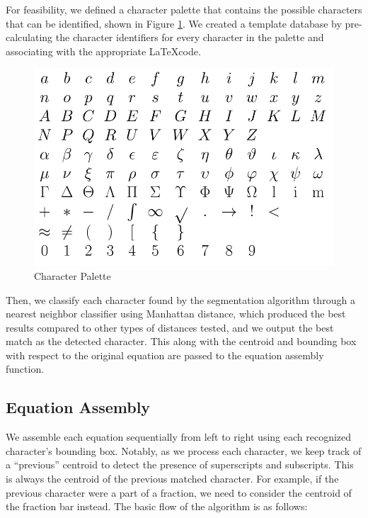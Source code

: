 \documentclass[journal]{IEEEtran}
\begin{document}
For feasibility, we defined a character palette that contains the possible characters that can be identified, shown in Figure \ref{fig:palette}. We created a template database by pre-calculating the character identifiers for every character in the palette and associating with the appropriate \LaTeX code. 


\begin{figure}[!t]
    \centering
    \includegraphics[width=\columnwidth]{palette}
    \caption{Character Palette}
    \label{fig:palette}
\end{figure}

Then, we classify each character found by the segmentation algorithm through a nearest neighbor classifier using Manhattan distance, which produced the best results compared to other types of distances tested, and we output the best match as the detected character. This along with the centroid and bounding box with respect to the original equation are passed to the equation assembly function.

\subsection{Equation Assembly}
We assemble each equation sequentially from left to right using each recognized character’s bounding box. Notably, as we process each character, we keep track of a “previous” centroid to detect the presence of superscripts and subscripts. This is always the centroid of the previous matched character. For example, if the previous character were a  part of a fraction, we need to consider the centroid of the fraction bar instead. The basic flow of the algorithm is as follows:
\end{document}
